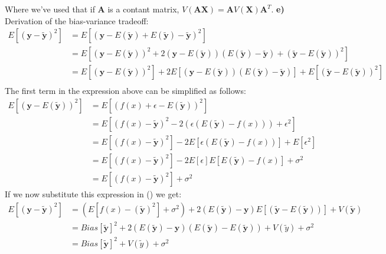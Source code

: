 \documentclass[11pt,a4paper,oldfontcommands]{memoir}
\begin{document}
Where we've used that if $\boldsymbol{A}$ is a contant matrix, 
$V(\boldsymbol{AX}) = \boldsymbol{A} V(\boldsymbol{X}) \boldsymbol{A}^T$.
\textbf{e)}\\
Derivation of the bias-variance tradeoff:
\begin{align*}
    E\left[(\boldsymbol{y} - \boldsymbol{\tilde y})^2\right] &= E\left[(\boldsymbol{y} - E(\boldsymbol{\tilde y}) + E(\boldsymbol{\tilde y}) - \boldsymbol{\tilde y})^2\right]\\
    &= E\left[(\boldsymbol{y} - E(\boldsymbol{\tilde y}))^2 + 2(\boldsymbol{y} - E(\boldsymbol{\tilde y}))(E(\boldsymbol{\tilde y}) - \boldsymbol{\tilde y}) + (\boldsymbol{\tilde y} - E(\boldsymbol{\tilde y}))^2\right]\\
    &= E\left[(\boldsymbol{y} - E(\boldsymbol{\tilde y}))^2\right] + 2E\left[(\boldsymbol{y} - E(\boldsymbol{\tilde y}))(E(\boldsymbol{\tilde y}) - \boldsymbol{\tilde y})\right] + E\left[(\boldsymbol{\tilde y} - E(\boldsymbol{\tilde y}))^2\right]\\
\end{align*}
The first term in the expression above can be simplified as follows:
\begin{align*}
    E\left[(\boldsymbol{y} - E(\boldsymbol{\tilde y}))^2\right] &= E\left[(f(x) + \epsilon - E(\boldsymbol{\tilde y}))^2\right]\\
    &= E\left[(f(x)-\boldsymbol{\tilde y})^2 - 2(\epsilon(E(\boldsymbol{\tilde y}) - f(x))) + \epsilon^2\right]\\
    &= E\left[(f(x)-\boldsymbol{\tilde y})^2\right] - 2E\left[\epsilon(E(\boldsymbol{\tilde y}) - f(x))\right] + E[\epsilon^2]\\
    &= E\left[(f(x) - \boldsymbol{\tilde y})^2\right] - 2E[\epsilon]E\left[E(\boldsymbol{\tilde y}) - f(x)\right]+ \sigma^2\\
    &= E\left[(f(x)-\boldsymbol{\tilde y})^2\right] + \sigma^2
\end{align*}
If we now substitute this expression in () we get:
\begin{align*}
    E\left[(\boldsymbol{y} - \boldsymbol{\tilde y})^2\right] &= (E\left[f(x)-(\boldsymbol{\tilde y})^2\right] + \sigma^2) + 2(E(\boldsymbol{\tilde y}) - \boldsymbol{y})E\left[(\boldsymbol{\tilde y} - E(\boldsymbol{\tilde y}))\right]+V(\boldsymbol{\tilde y})\\
    &= Bias[\boldsymbol{\tilde y}]^2 + 2(E(\boldsymbol{\tilde y}) - \boldsymbol{y})(E(\boldsymbol{\tilde y}) - E(\boldsymbol{\tilde y})) + V(\tilde y) + \sigma^2\\
    &= Bias[\boldsymbol{\tilde y}]^2 + V(\tilde y) + \sigma^2
\end{align*}
\end{document}
